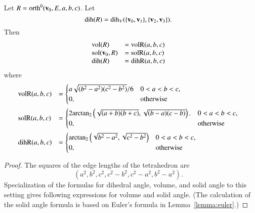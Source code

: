 \begin{lemma}[]\label{lemma:orth:abc} 
Let $R={\operatorname{orth}}^0({\mathbf v}_0,E,a,b,c)$.  Let 
\begin{displaymath}
{\operatorname{dih}}(R) = \operatorname{dih}_V(\{{\mathbf v}_0,{\mathbf v}_1\},\{{\mathbf v}_2,{\mathbf v}_3\}).
\end{displaymath} 
Then
\begin{displaymath}
\begin{array}{lll}
{\operatorname{vol}}(R) &= {\operatorname{volR}}(a,b,c)\\
\operatorname{sol}({\mathbf v}_0,R) &= {\operatorname{solR}}(a,b,c)\\
{\operatorname{dih}}(R) &= {\operatorname{dihR}}(a,b,c)\\
\end{array}
\end{displaymath}
where
\begin{displaymath}
\begin{array}{lll}
\op{volR}(a,b,c) &= \begin{cases}
a\sqrt{(b^2-a^2)(c^2-b^2)}/6& 0 < a < b < c,\\
0,&\text{otherwise}
\end{cases}\vspace{6pt}\\
\op{solR}(a,b,c) &= \begin{cases}
2 \atn\left(\sqrt{{(a+b)(b+c)}},
\sqrt{{(b-a) (c-b)}}\right).& 0 < a < b < c,\\
0,&\text{otherwise}
\end{cases} \vspace{6pt}\\
\op{dihR}(a,b,c) &= \begin{cases}
\atn\left(\sqrt{b^2 - a^2},\sqrt{c^2 - b^2}\right)
& 0 < a < b < c,\\
0,&\text{otherwise}
\end{cases}
\end{array}
\end{displaymath}
%
%
%
\end{lemma}

\begin{proof}
The squares of the edge lengths of the tetrahedron are
\begin{displaymath}
(a^2,b^2,c^2,c^2-b^2,c^2-a^2,b^2-a^2).
\end{displaymath}
Specialization of the formulas for dihedral angle, volume, and solid
angle to this setting gives following expressions for volume and solid
angle.  (The calculation of the solid angle formula is based on
Euler's formula in Lemma~\ref{lemma:euler}.)
\end{proof}

